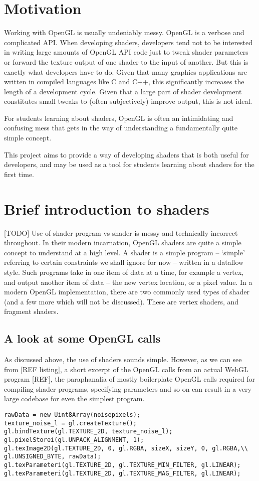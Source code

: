 \documentclass[12pt,twoside,notitlepage]{report}
\begin{document}
\section{Motivation}
Working with OpenGL is usually undeniably messy. OpenGL is a verbose and complicated API. When developing shaders, developers tend not to be interested in writing large amounts of OpenGL API code just to tweak shader parameters or forward the texture output of one shader to the input of another. But this is exactly what developers have to do. Given that many graphics applications are written in compiled languages like C and C++, this significantly increases the length of a development cycle. Given that a large part of shader development constitutes small tweaks to (often subjectively) improve output, this is not ideal.

For students learning about shaders, OpenGL is often an intimidating and confusing mess that gets in the way of understanding a fundamentally quite simple concept.

This project aims to provide a way of developing shaders that is both useful for developers, and may be used as a tool for students learning about shaders for the first time.
\section{Brief introduction to shaders}
[TODO] Use of shader program vs shader is messy and technically incorrect throughout.
In their modern incarnation, OpenGL shaders are quite a simple concept to understand at a high level. A shader is a simple program -- `simple' referring to certain constraints we shall ignore for now -- written in a dataflow style. Such programs take in one item of data at a time, for example a vertex, and output another item of data -- the new vertex location, or a pixel value.
In a modern OpenGL implementation, there are two commonly used types of shader (and a few more which will not be discussed). These are vertex shaders, and fragment shaders. 
\subsection{A look at some OpenGL calls}
As discussed above, the use of shaders sounds simple. However, as we can see from [REF listing], a short excerpt of the OpenGL calls from an actual WebGL program [REF], the paraphanalia of mostly boilerplate OpenGL calls required for compiling shader programs, specifying parameters and so on can result in a very large codebase for even the simplest program.
\begin{verbatim}
rawData = new Uint8Array(noisepixels);
texture_noise_l = gl.createTexture();
gl.bindTexture(gl.TEXTURE_2D, texture_noise_l);
gl.pixelStorei(gl.UNPACK_ALIGNMENT, 1);
gl.texImage2D(gl.TEXTURE_2D, 0, gl.RGBA, sizeX, sizeY, 0, gl.RGBA,\\ gl.UNSIGNED_BYTE, rawData);
gl.texParameteri(gl.TEXTURE_2D, gl.TEXTURE_MIN_FILTER, gl.LINEAR);
gl.texParameteri(gl.TEXTURE_2D, gl.TEXTURE_MAG_FILTER, gl.LINEAR);
\end{verbatim}
\cleardoublepage
\end{document}

